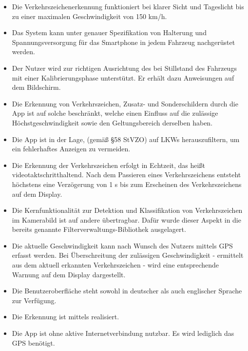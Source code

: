 \documentclass[12pt,a4paper,ngerman,enabledeprecatedfontcommands]{scrreprt}
\begin{document}
\begin{itemize}

\item Die Verkehrszeichenerkennung funktioniert bei klarer Sicht und Tageslicht bis zu einer maximalen Geschwindigkeit von 150 km/h.

\item Das \gls{System} kann unter genauer Spezifikation von Halterung und Spannungsversorgung für das \gls{Smartphone} in jedem \gls{Fahrzeug} nachgerüstet werden.

\item Der \gls{Nutzer} wird zur richtigen Ausrichtung des  bei Stillstand des Fahrzeugs mit einer Kalibrierungsphase unterstützt. Er erhält dazu Anweisungen auf dem Bildschirm.

\item Die Erkennung von Verkehrszeichen, Zusatz- und Sonderschildern durch die \gls{App} ist auf solche beschränkt, welche einen Einfluss auf die zulässige Höchstgeschwindigkeit sowie den Geltungsbereich derselben haben.

\item Die \gls{App} ist in der Lage,  (gemäß §58 \gls{StVZO}) auf LKWs herauszufiltern, um ein fehlerhaftes Anzeigen zu vermeiden.

\item Die Erkennung der Verkehrszeichen erfolgt in Echtzeit, das heißt videotaktschritthaltend. Nach dem Passieren eines Verkehrszeichens entsteht höchstens eine Verzögerung von 1 s bis zum Erscheinen des Verkehrszeichens auf dem Display.

\item Die Kernfunktionalität zur \gls{Detektion} und \gls{Klassifikation} von Verkehrszeichen im Kamerabild ist auf andere  übertragbar. Dafür wurde dieser Aspekt in die bereits genannte \glqq{}\gls{Filterverwaltungs-Bibliothek}\grqq{} ausgelagert.

\item Die aktuelle Geschwindigkeit kann nach Wunsch des \gls{Nutzer}s mittels GPS erfasst werden. Bei Überschreitung der zulässigen Geschwindigkeit - ermittelt aus dem aktuell erkannten Verkehrszeichen - wird eine entsprechende Warnung auf dem Display dargestellt.

\item Die Benutzeroberfläche steht sowohl in deutscher als auch englischer Sprache zur Verfügung.

\item Die Erkennung ist mittels  realisiert.

\item Die \gls{App} ist ohne aktive Internetverbindung nutzbar. Es wird lediglich das GPS benötigt.

\end{itemize}
\end{document}
